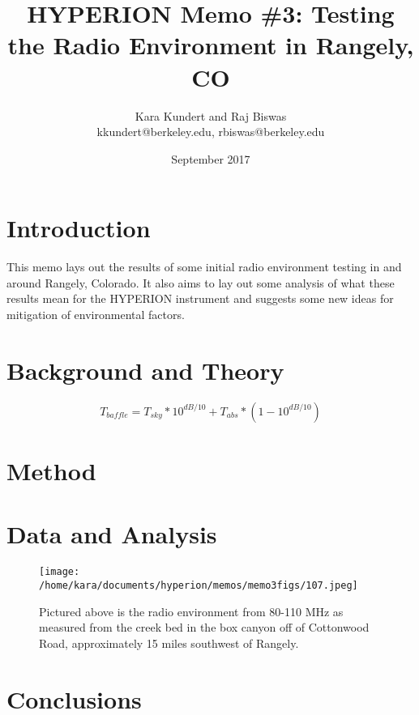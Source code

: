 \documentclass[11pt]{article}
\makeatletter
\newcommand{\thetitle}{HYPERION Memo \#3: Testing the Radio Environment in 
Rangely, CO}
\newcommand{\theauthor}{Kara Kundert and Raj Biswas}
\newcommand{\theauthorsemail}{kkundert@berkeley.edu, rbiswas@berkeley.edu}
\newcommand{\thedate}{September 2017}
\makeatother
\begin{document}
\title{
    \sffamily\bfseries\huge
    \thetitle \\
}
\author{
    \sffamily\theauthor \\
    \sffamily\theauthorsemail
}
\date{\thedate}
\maketitle
\sloppy

\section{Introduction}

This memo lays out the results of some initial radio environment testing in and 
around Rangely, Colorado. It also aims to lay out some analysis of what these 
results mean for the HYPERION instrument and suggests some new ideas for 
mitigation of environmental factors.

\section{Background and Theory}

\citep{pritchard-loeb2010}

\begin{equation}
    \label{eq:baffle-temp}
    T_{baffle} = T_{sky} * 10^{dB/10} + T_{abs} * (1 - 10^{dB/10})
\end{equation}

\section{Method}


\section{Data and Analysis}

\begin{figure}
    \begin{center}
    \texttt{[image: /home/kara/documents/hyperion/memos/memo3figs/107.jpeg]}
    \end{center}
    \caption{
        Pictured above is the radio environment from 80-110 MHz as measured 
        from the creek bed in the box canyon off of Cottonwood Road, 
        approximately 15 miles southwest of Rangely.
    }
    \label{fig:sys-temp}
\end{figure}

\section{Conclusions}


{}

\end{document}
